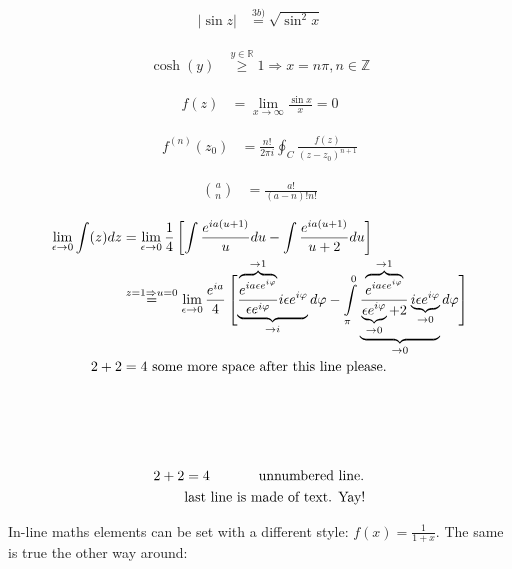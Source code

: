 \documentclass[12pt, a4paper, twopage]{scrartcl}
\newcommand{\limz}[1]{\lim\limits_{#1 \rightarrow 0}}
\begin{document}
\begin{align}
	 |\sin z| &\overset{3b)}= \sqrt{\sin^2 x}
\end{align}


\begin{align}
	 \cosh(y) & \overset{y \in \mathbb{R}} \geq 1 \Rightarrow x = n \pi, n \in \mathbb{Z}
\end{align}
	
	
\begin{align}
	 f(z) &= \lim\limits_{x\rightarrow \infty} \frac{\sin x}{x} = 0
\end{align}


\begin{align}
	 f^{(n)} (z_0) &= \frac{n!}{2\pi i} \oint_C  \frac{f(z)}{(z - z_0)^{n + 1}}
\end{align}


\begin{align}
	 \binom{a}{n} &= \frac{a!}{(a-n)! n!}
\end{align}


\begin{align}
	 \nonumber \limz{\epsilon}\int(z) dz &= \limz{\epsilon} \frac14 \left[ \int\frac{e^{ia(u + 1)}}{u} du - \int\frac{e^{ia(u + 1)}}{u + 2}du   \right]\\[1em]
	 & \overset{z = 1 \Rightarrow u = 0}= \limz{\epsilon} \frac{e^{i a}}{4} \left[\vphantom{ \int\limits_{\pi}^0} \smash{ \underbrace{\frac{\overbrace{e^{ia \epsilon e^{i \varphi}}}^{\rightarrow 1}} {\epsilon e^{i \varphi}} i \epsilon e^{i \varphi}}_{\rightarrow i}  d \varphi            - \int\limits_{\pi}^0 \underbrace{\frac{\overbrace{e^{ia \epsilon e^{i \varphi}}}^{\rightarrow 1}} {\underbrace{\epsilon e^{i \varphi}}_{\rightarrow 0} + 2} \underbrace{i \epsilon e^{i \varphi}}_{\rightarrow 0}}_{\rightarrow 0}  d \varphi  }\right]\\[2em]
	 2 + 2 &= 4 \ \text{some more space after this line please.}\\[4em]\nonumber
\end{align}


\begin{align}
	 \nonumber  2 + 2 &= 4 \text{ \hspace{1cm} unnumbered line.}\\
	 &\text{last line is made of text. Yay!}
\end{align}




In-line maths elements can be set with a different style: \(f(x) = \displaystyle \frac{1}{1+x}\). The same is true the other way around:
\end{document}
